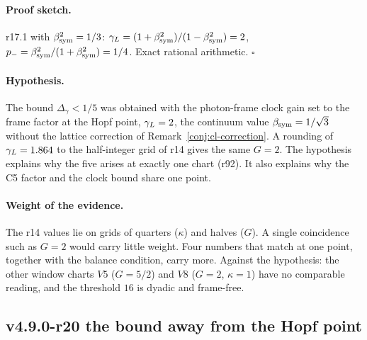 \paragraph{Proof sketch.}
r17.1 with \(\beta_{\mathrm{sym}}^2=1/3\): \(\gamma_L=(1+\beta_{\mathrm{sym}}^2)/(1-\beta_{\mathrm{sym}}^2)=2\), \(p_-=\beta_{\mathrm{sym}}^2/(1+\beta_{\mathrm{sym}}^2)=1/4\).  Exact rational arithmetic.  \(\square\)

\paragraph{Hypothesis.}
The bound \(\Delta_\gamma<1/5\) was obtained with the photon-frame clock gain set to the frame factor at the Hopf point,
\(\gamma_L=2\), the continuum value \(\beta_{\mathrm{sym}}=1/\sqrt3\) without the lattice correction of Remark~\ref{conj:cl-correction}.  A rounding
of \(\gamma_L=1.864\) to the half-integer grid of r14 gives the same \(G=2\).  The hypothesis explains why the five arises at
exactly one chart (r92).  It also explains why the C5 factor and the clock bound share one point.

\paragraph{Weight of the evidence.}
The r14 values lie on grids of quarters (\(\kappa\)) and halves (\(G\)).  A single coincidence such as \(G=2\) would carry little
weight.  Four numbers that match at one point, together with the balance condition, carry more.  Against the hypothesis:
the other window charts \(V5\) (\(G=5/2\)) and \(V8\) (\(G=2\), \(\kappa=1\)) have no comparable reading, and the threshold \(16\) is
dyadic and frame-free.

\subsection*{v4.9.0-r20 the bound away from the Hopf point}
\label{subsec:v490-r20-away}

